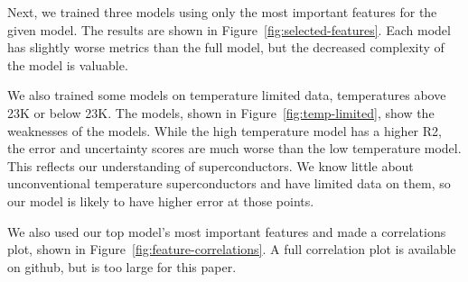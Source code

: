 \documentclass[twocolumn, nofootinbib, secnumarabic, amssymb, nobibnotes, aps, prd]{revtex4-2}
\begin{document}

Next, we trained three models using only the most important features for the given model. The results are shown in Figure~\ref{fig:selected-features}. Each model has slightly worse metrics than the full model, but the decreased complexity of the model is valuable.

We also trained some models on temperature limited data, temperatures above 23K or below 23K. The models, shown in Figure~\ref{fig:temp-limited}, show the weaknesses of the models. While the high temperature model has a higher R2, the error and uncertainty scores are much worse than the low temperature model. This reflects our understanding of superconductors. We know little about unconventional temperature superconductors and have limited data on them, so our model is likely to have higher error at those points.

We also used our top model's most important features and made a correlations plot, shown in Figure~\ref{fig:feature-correlations}. A full correlation plot is available on github, but is too large for this paper.
\end{document}
